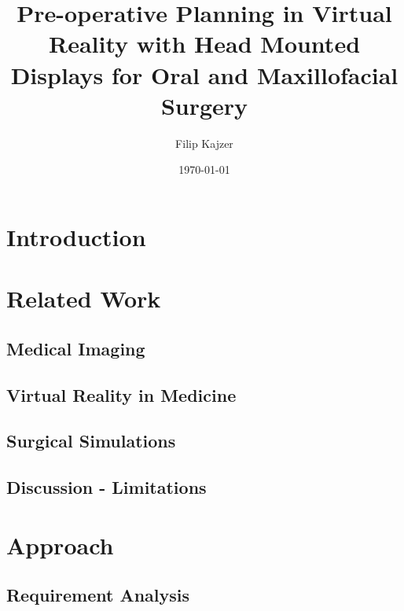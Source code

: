 \documentclass[twoside, parskip]{VRThesis} %
\title{Pre-operative Planning in Virtual Reality with Head Mounted Displays for Oral and Maxillofacial Surgery}
\author{Filip Kajzer}
\date{\today}
\begin{document}
\maketitle
\maketitleMaster %

\makestatement

\tableofcontents

\chapter{\label{chap::Introduction}Introduction}


\chapter{\label{chap::RelatedWork}Related Work}

\section{\label{sec::MedicalImaging}Medical Imaging}

\section{\label{sec::VirtualRealityInMedicine}Virtual Reality in Medicine}

\section{\label{sec::SurgicalSimulations}Surgical Simulations}

\section{\label{sec::RelatedWorkDiscussion}Discussion - Limitations}



\chapter{\label{chap::Approach}Approach}

\section{\label{sec::RequirementAnalysis}Requirement Analysis}

\end{document}
